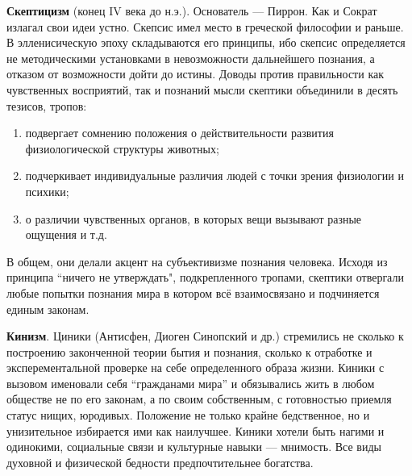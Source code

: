 \documentclass[12pt]{article}
\begin{document}
\textbf{Скептицизм} (конец IV века до н.э.). Основатель --- Пиррон.
Как и Сократ излагал свои идеи устно. Скепсис имел место в греческой философии
и раньше. В элленисическую эпоху складываются его принципы, ибо скепсис определяется
не методическими установками в
невозможности  дальнейшего  познания,  а  отказом  от  возможности  дойти  до  истины.  Доводы  против
правильности как чувственных восприятий, так и познаний мысли скептики объединили в десять тезисов,
тропов: 
\begin{enumerate}
  \item подвергает сомнению положения о действительности развития физиологической структуры животных; 
  \item подчеркивает индивидуальные различия людей с точки зрения физиологии и психики; 
  \item о различии чувственных органов, в которых вещи вызывают разные ощущения и т.д.
\end{enumerate}
В общем, они делали
акцент на субъективизме познания человека.
Исходя из принципа ``ничего не утверждать", подкрепленного тропами,
скептики отвергали любые попытки познания мира в котором всё взаимосвязано и
подчиняется единым законам. 

\textbf{Кинизм}. Циники (Антисфен, Диоген Синопский и др.) стремились не сколько к построению законченной
теории бытия и познания, сколько к отработке и эксперементальной
проверке на себе определенного образа жизни. Киники с
вызовом именовали себя “гражданами мира” и обязывались жить в любом обществе не по его законам, а по своим
собственным, с готовностью приемля статус нищих, юродивых. Положение не только крайне бедственное, но и
унизительное избирается ими как наилучшее. Киники хотели быть нагими и одинокими, социальные связи
и культурные навыки --- мнимость. Все виды духовной и физической бедности предпочтительнее богатства. 
\end{document}
